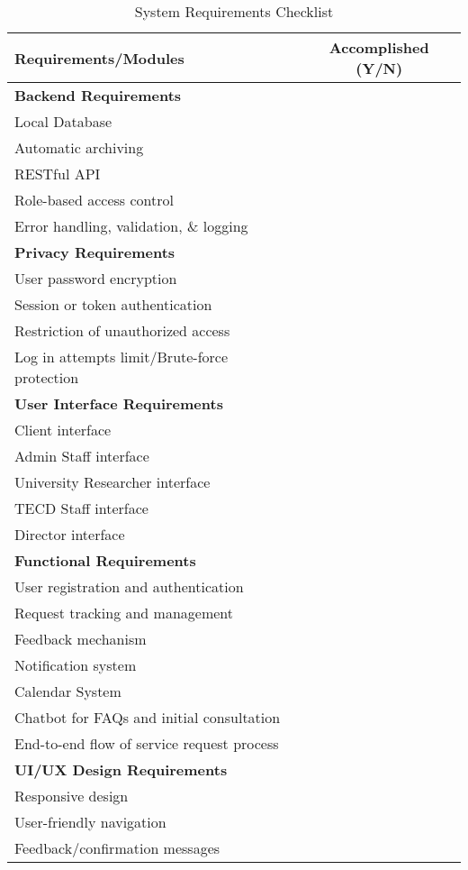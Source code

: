 \newpage

\begin{table}[ht]
	\centering
	\begin{tabular}{|p{10cm}|c|}
		\hline
		\textbf{Requirements/Modules} & \textbf{Accomplished (Y/N)} \\
		\hline
		\multicolumn{2}{|l|}{\textbf{Backend Requirements}} \\
		\hline
		Local Database & \\
		Automatic archiving & \\
		RESTful API & \\
		Role-based access control & \\
		Error handling, validation, \& logging & \\
		\hline
		\multicolumn{2}{|l|}{\textbf{Privacy Requirements}} \\
		\hline
		User password encryption & \\
		Session or token authentication & \\
		Restriction of unauthorized access & \\
		Log in attempts limit/Brute-force protection & \\
		\hline
		\multicolumn{2}{|l|}{\textbf{User Interface Requirements}} \\
		\hline
		Client interface & \\
		Admin Staff interface & \\
		University Researcher interface & \\
		TECD Staff interface & \\
		Director interface & \\
		\hline
		\multicolumn{2}{|l|}{\textbf{Functional Requirements}} \\
		\hline
		User registration and authentication & \\
		Request tracking and management & \\
		Feedback mechanism & \\
		Notification system & \\
		Calendar System & \\
		Chatbot for FAQs and initial consultation & \\
		End-to-end flow of service request process & \\
		\hline
		\multicolumn{2}{|l|}{\textbf{UI/UX Design Requirements}} \\
		\hline
		Responsive design & \\
		User-friendly navigation & \\
		Feedback/confirmation messages & \\
		\hline
	\end{tabular}
	\caption{System Requirements Checklist}
	\label{tab:requirements}
\end{table}

